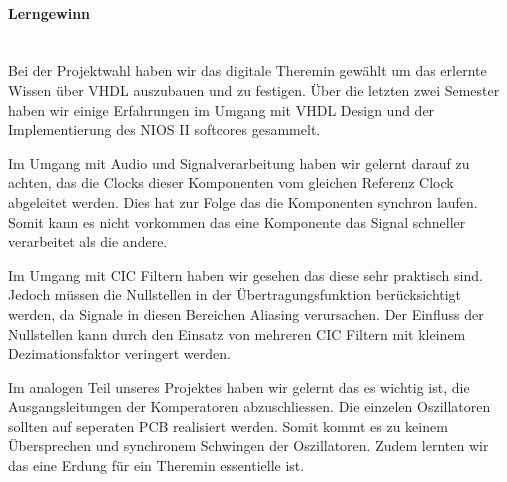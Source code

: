 \paragraph{Lerngewinn} \mbox{}\\
Bei der Projektwahl haben wir das digitale Theremin gewählt um das erlernte Wissen über VHDL auszubauen und zu festigen. Über die letzten zwei Semester haben wir einige Erfahrungen im Umgang mit VHDL Design und der Implementierung des NIOS II softcores gesammelt.

Im Umgang mit Audio und Signalverarbeitung haben wir gelernt darauf zu achten, das die Clocks dieser Komponenten vom gleichen Referenz Clock abgeleitet werden. Dies hat zur Folge das die Komponenten synchron laufen. Somit kann es nicht vorkommen das eine Komponente das Signal schneller verarbeitet als die andere. 

Im Umgang mit CIC Filtern haben wir gesehen das diese sehr praktisch sind. Jedoch müssen die Nullstellen in der Übertragungsfunktion berücksichtigt werden, da Signale in diesen Bereichen Aliasing verursachen. Der Einfluss der Nullstellen kann durch den Einsatz von mehreren CIC Filtern mit kleinem Dezimationsfaktor veringert werden.

Im analogen Teil unseres Projektes haben wir gelernt das es wichtig ist, die Ausgangsleitungen der Komperatoren abzuschliessen. Die einzelen Oszillatoren sollten auf seperaten PCB realisiert werden. Somit kommt es zu keinem Übersprechen und synchronem Schwingen der Oszillatoren.  Zudem lernten wir das eine Erdung für ein Theremin essentielle ist.
